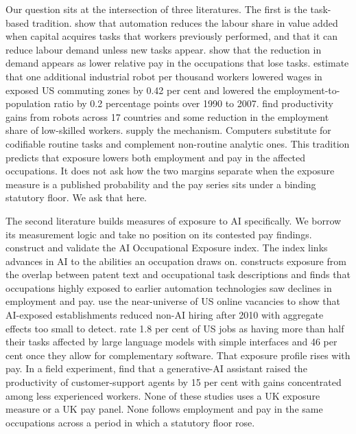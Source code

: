 \documentclass[12pt,leqno]{article}
\begin{document}
Our question sits at the intersection of three literatures. The first is the task-based tradition. \citet{acemoglu2019automation} show that automation reduces the labour share in value added when capital acquires tasks that workers previously performed, and that it can reduce labour demand unless new tasks appear. \citet{acemoglu2022tasks} show that the reduction in demand appears as lower relative pay in the occupations that lose tasks. \citet{acemoglu2020robots} estimate that one additional industrial robot per thousand workers lowered wages in exposed US commuting zones by 0.42 per cent and lowered the employment-to-population ratio by 0.2 percentage points over 1990 to 2007. \citet{graetz2018robots} find productivity gains from robots across 17 countries and some reduction in the employment share of low-skilled workers. \citet{autor2003skill} supply the mechanism. Computers substitute for codifiable routine tasks and complement non-routine analytic ones. This tradition predicts that exposure lowers both employment and pay in the affected occupations. It does not ask how the two margins separate when the exposure measure is a published probability and the pay series sits under a binding statutory floor. We ask that here.

The second literature builds measures of exposure to AI specifically. We borrow its measurement logic and take no position on its contested pay findings. \citet{felten2021occupational} construct and validate the AI Occupational Exposure index. The index links advances in AI to the abilities an occupation draws on. \citet{webb2020impact} constructs exposure from the overlap between patent text and occupational task descriptions and finds that occupations highly exposed to earlier automation technologies saw declines in employment and pay. \citet{acemoglu2022vacancies} use the near-universe of US online vacancies to show that AI-exposed establishments reduced non-AI hiring after 2010 with aggregate effects too small to detect. \citet{eloundou2024gpts} rate 1.8 per cent of US jobs as having more than half their tasks affected by large language models with simple interfaces and 46 per cent once they allow for complementary software. That exposure profile rises with pay. In a field experiment, \citet{brynjolfsson2025generative} find that a generative-AI assistant raised the productivity of customer-support agents by 15 per cent with gains concentrated among less experienced workers. None of these studies uses a UK exposure measure or a UK pay panel. None follows employment and pay in the same occupations across a period in which a statutory floor rose.
\end{document}
